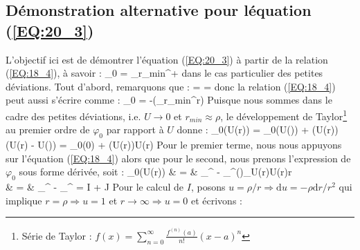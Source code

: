 \subsection{D\'emonstration alternative pour l\'equation (\ref{EQ:20_3})}

L'objectif ici est de d\'emontrer l'\'equation (\ref{EQ:20_3}) \`a partir de la relation (\ref{EQ:18_4}), \`a savoir :
\be
	\varphi_{0} = \bigintss_{r_{min}}^{+\infty}{}
\ee
dans le cas particulier des petites d\'eviations. Tout d'abord, remarquons que :
\be
	 =  = 
\ee
donc la relation (\ref{EQ:18_4}) peut aussi s'\'ecrire comme :
\be
	\varphi_{0} = -\dfrac{\partial}{\partial \rho}\left(\bigintsss_{r_{min}}^{\infty}r\right)
\ee
Puisque nous sommes dans le cadre des petites d\'eviations, i.e. $U \rightarrow 0$ et $r_{min} \approx \rho$, le d\'eveloppement de Taylor\footnote{S\'erie de Taylor : $f(x) = \sum_{n=0}^{\infty}\frac{f^{(n)}(a)}{n!}(x - a)^{n}$} au premier ordre de $\varphi_{0}$ par rapport \`a $U$ donne :
\be
	\varphi_{0}(U(r)) = \varphi_{0}(U(\infty)) + (U(r))\cdot(U(r) - U(\infty))  = \varphi_{0}(0) + (U(r))\cdot U(r)
\ee
Pour le premier terme, nous nous appuyons sur l'\'equation (\ref{EQ:18_4}) alors que pour le second, nous prenons l'expression de $\varphi_{0}$ sous forme d\'eriv\'ee, soit :
\bea
	\varphi_{0}(U(r)) & = & \bigintss_{\rho}^{\infty} - \dfrac{\partial}{\partial\rho}\bigints_{\rho}^{\infty}\left(\right)_{U(r)}\cdot U(r)r \nonumber \\
	& = & \bigintss_{\rho}^{\infty} - \bigintss_{\rho}^{\infty} = I + \dfrac{\partial}{\partial\rho}J
\eea
Pour le calcul de $I$, posons $u = \rho/r \Rightarrow \mathrm{d}u = -\rho\mathrm{d}r/r^{2}$ qui implique $r = \rho \Rightarrow u = 1$ et $r \rightarrow \infty \Rightarrow u = 0$ et \'ecrivons :
